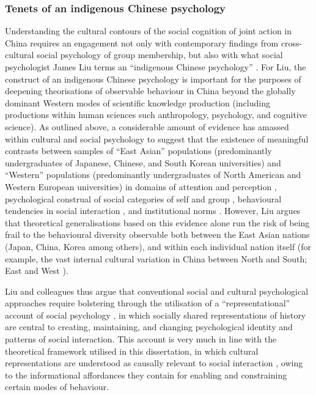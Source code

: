 \begin{CJK}{UTF8}{gbsn}
\subsubsection{Tenets of an indigenous Chinese psychology\label{sect:indigPsych}}
Understanding the cultural contours of the social cognition of joint action in China requires an engagement not only with contemporary findings from cross-cultural social psychology of group membership, but also with what social psychologist James Liu terms an ``indigenous Chinese psychology'' \citep{Liu2009}. For Liu, the construct of an indigenous Chinese psychology is important for the purposes of deepening theorisations of observable behaviour in China beyond the globally dominant Western modes of scientific knowledge production (including productions within human sciences such anthropology, psychology, and cognitive science).  As outlined above, a considerable amount of evidence has amassed within cultural and social psychology to suggest that the existence of meaningful contrasts between samples of ``East Asian'' populations (predominantly undergraduates of Japanese, Chinese, and South Korean universities) and ``Western'' populations (predominantly undergraduates of North American and Western European universities) in domains of attention and perception \citep{Peng1997,Nisbett2003}, psychological construal of social categories of self and group \citep{Markus1991}, behavioural tendencies in social interaction \citep{Yuki2003}, and institutional norms \citep{Liu2017}.  However, Liu argues that theoretical generalisations based on this evidence alone run the risk of being frail to the behavioural diversity observable both between the East Asian nations (Japan, China, Korea among others), and within each individual nation itself (for example, the vast internal cultural variation in China between North and South; East and West \citep[see, for example,][]{Henrich2014}).

Liu and colleagues thus argue that conventional social and cultural psychological approaches require bolstering through the utilisation of a ``representational'' account of social psychology \citep{Liu2005}, in which socially shared representations of history are central to creating, maintaining, and changing psychological identity and patterns of social interaction.  This account is very much in line with the theoretical framework utilised in this dissertation, in which cultural representations are understood as causally relevant to social interaction \citep{Vesper2017}, owing to the informational affordances they contain for enabling and constraining certain modes of behaviour.


\end{CJK}
